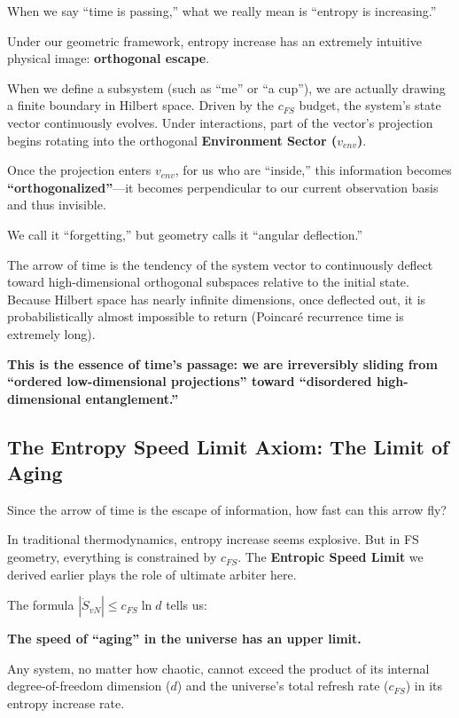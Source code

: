 When we say ``time is passing,'' what we really mean is ``entropy is increasing.''

Under our geometric framework, entropy increase has an extremely intuitive physical image: \textbf{orthogonal escape}.

When we define a subsystem (such as ``me'' or ``a cup''), we are actually drawing a finite boundary in Hilbert space. Driven by the $c_{FS}$ budget, the system's state vector continuously evolves. Under interactions, part of the vector's projection begins rotating into the orthogonal \textbf{Environment Sector ($v_{env}$)}.

Once the projection enters $v_{env}$, for us who are ``inside,'' this information becomes \textbf{``orthogonalized''}---it becomes perpendicular to our current observation basis and thus invisible.

We call it ``forgetting,'' but geometry calls it ``angular deflection.''

The arrow of time is the tendency of the system vector to continuously deflect toward high-dimensional orthogonal subspaces relative to the initial state. Because Hilbert space has nearly infinite dimensions, once deflected out, it is probabilistically almost impossible to return (Poincaré recurrence time is extremely long).

\textbf{This is the essence of time's passage: we are irreversibly sliding from ``ordered low-dimensional projections'' toward ``disordered high-dimensional entanglement.''}

\subsection{The Entropy Speed Limit Axiom: The Limit of Aging}

Since the arrow of time is the escape of information, how fast can this arrow fly?

In traditional thermodynamics, entropy increase seems explosive. But in FS geometry, everything is constrained by $c_{FS}$. The \textbf{Entropic Speed Limit} we derived earlier plays the role of ultimate arbiter here.

The formula $|\dot{S}_{vN}| \le c_{FS} \ln d$ tells us:

\textbf{The speed of ``aging'' in the universe has an upper limit.}

Any system, no matter how chaotic, cannot exceed the product of its internal degree-of-freedom dimension ($d$) and the universe's total refresh rate ($c_{FS}$) in its entropy increase rate.

